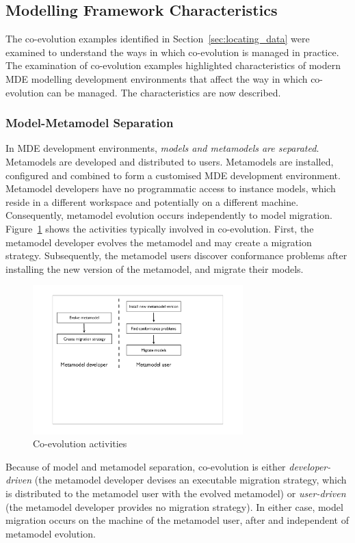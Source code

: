 \subsection{Modelling Framework Characteristics}
\label{subsec:modelling_framework_characteristics}
The co-evolution examples identified in Section~\ref{sec:locating_data} were examined to understand the ways in which co-evolution is managed in practice. The examination of co-evolution examples highlighted characteristics of modern MDE modelling development environments that affect the way in which co-evolution can be managed. The characteristics are now described.

\subsubsection{Model-Metamodel Separation}
In MDE development environments, \emph{models and metamodels are separated}. Metamodels are developed and distributed to users. Metamodels are installed, configured and combined to form a customised MDE development environment. Metamodel developers have no programmatic access to instance models, which reside in a different workspace and potentially on a different machine. Consequently, metamodel evolution occurs independently to model migration. Figure~\ref{fig:co-evo_activities} shows the activities typically involved in co-evolution. First, the metamodel developer evolves the metamodel and may create a migration strategy. Subsequently, the metamodel users discover conformance problems after installing the new version of the metamodel, and migrate their models.

\begin{figure}[htbp]
	\centering
		\includegraphics*[viewport=80 250 600 550,height=5.75cm]{4.Analysis/images/co-evo_activities.pdf}
	\caption{Co-evolution activities}
	\label{fig:co-evo_activities}
\end{figure}

Because of model and metamodel separation, co-evolution is either \emph{developer-driven} (the metamodel developer devises an executable migration strategy, which is distributed to the metamodel user with the evolved metamodel) or \emph{user-driven} (the metamodel developer provides no migration strategy). In either case, model migration occurs on the machine of the metamodel user, after and independent of metamodel evolution.


